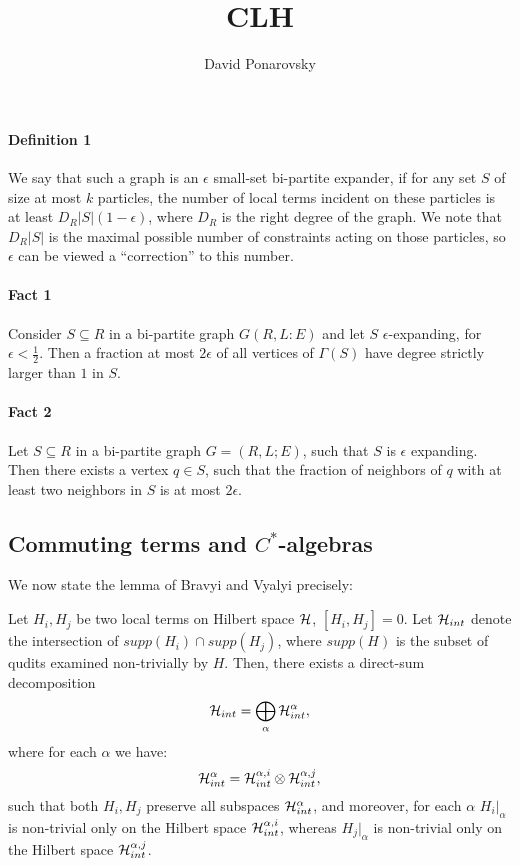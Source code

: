 \documentclass{article}
\title{CLH}
\author{David Ponarovsky}
\newcommand{\eps}{\epsilon}
\begin{document}
\maketitle

\paragraph{Definition 1} 
We say that such a graph is an $\epsilon$ small-set bi-partite
expander, if for any set $S$ of size at most $k$ particles, the number of local
terms incident on these particles is at least $D_R |S| (1-\epsilon)$, where
$D_R$ is the right degree of the graph.
We note that
$D_R |S|$ is the maximal possible number of constraints acting on those
particles, so $\epsilon$ can be viewed a ``correction'' to this number.

\paragraph{Fact 1}
Consider $S\subseteq R$  in a bi-partite graph $G(R,L:E)$
and let $S$ $\epsilon$-expanding, for $\eps<\frac{1}{2}$.
Then a fraction at most $2\eps$ of all
vertices of $\Gamma(S)$ have degree strictly larger than $1$ in $S$.

\paragraph{Fact 2}
Let $S\subseteq R$ in a bi-partite graph $G = (R,L;E)$, such that $S$ is $\eps$ expanding.
Then there exists a vertex $q\in S$,
such that the fraction of neighbors of $q$ with at least two neighbors in $S$
is at most $2\eps$.

\subsection{Commuting terms and \texorpdfstring{$C^*$}{TEXT}-algebras}\label{sec:bv}
We now state the lemma of Bravyi and Vyalyi \cite{Bra} precisely:
\begin{lemma}\label{lem:BV}
Let $H_i,H_j$ be two local terms on Hilbert space ${\cal H}$, $[H_i,H_j]=0$.
Let ${\cal H}_{int}$ denote the intersection of $supp(H_i)\cap supp(H_j)$, where $supp(H)$ is the subset of qudits examined non-trivially by $H$.
Then, there exists a direct-sum decomposition
$${\cal H}_{int} = \bigoplus_{\alpha} {\cal H}_{int}^{\alpha},$$
where for each $\alpha$ we have:
$${\cal H}_{int}^{\alpha} = {\cal H}_{int}^{\alpha,i}\otimes {\cal H}_{int}^{\alpha,j},$$
such that
both $H_i,H_j$ preserve all subspaces ${\cal H}_{int}^{\alpha}$, and moreover,
for each $\alpha$ $H_i|_{\alpha}$ is non-trivial only on the Hilbert space ${\cal H}_{int}^{\alpha,i}$,
whereas $H_j|_{\alpha}$ is non-trivial only on the Hilbert space ${\cal H}_{int}^{\alpha,j}$.
\end{lemma}




\end{document}
